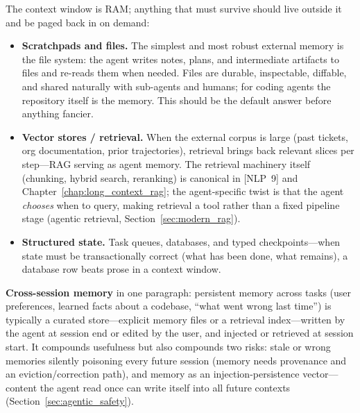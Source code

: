 The context window is RAM; anything that must survive should live outside it and be paged back in on demand:

\begin{itemize}
    \item \textbf{Scratchpads and files.} The simplest and most robust external memory is the file system: the agent writes notes, plans, and intermediate artifacts to files and re-reads them when needed. Files are durable, inspectable, diffable, and shared naturally with sub-agents and humans; for coding agents the repository itself is the memory. This should be the default answer before anything fancier.
    \item \textbf{Vector stores / retrieval.} When the external corpus is large (past tickets, org documentation, prior trajectories), retrieval brings back relevant slices per step---RAG serving as agent memory. The retrieval machinery itself (chunking, hybrid search, reranking) is canonical in [NLP~9] and Chapter~\ref{chap:long_context_rag}; the agent-specific twist is that the agent \textit{chooses} when to query, making retrieval a tool rather than a fixed pipeline stage (agentic retrieval, Section~\ref{sec:modern_rag}).
    \item \textbf{Structured state.} Task queues, databases, and typed checkpoints---when state must be transactionally correct (what has been done, what remains), a database row beats prose in a context window.
\end{itemize}

\textbf{Cross-session memory} in one paragraph: persistent memory across tasks (user preferences, learned facts about a codebase, ``what went wrong last time'') is typically a curated store---explicit memory files or a retrieval index---written by the agent at session end or edited by the user, and injected or retrieved at session start. It compounds usefulness but also compounds two risks: stale or wrong memories silently poisoning every future session (memory needs provenance and an eviction/correction path), and memory as an injection-persistence vector---content the agent read once can write itself into all future contexts (Section~\ref{sec:agentic_safety}).

